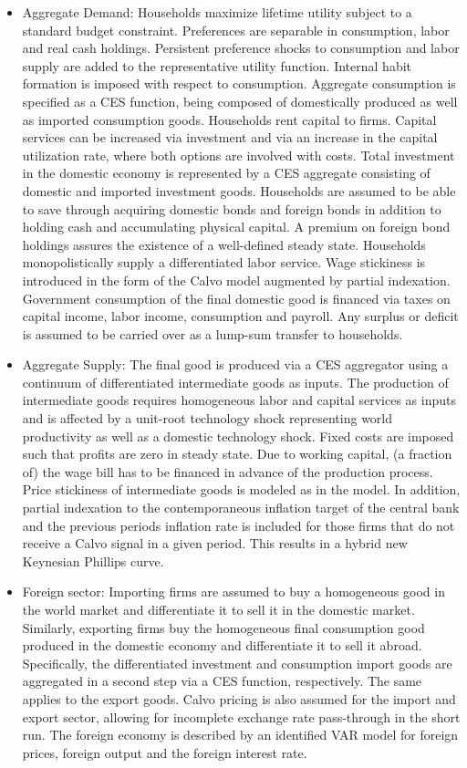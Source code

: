 \documentclass[11pt,a4paper]{article}
\begin{document}
	\begin{itemize}
		\item Aggregate Demand: Households maximize lifetime utility subject to a standard budget constraint. Preferences are separable in consumption, labor and real cash holdings. Persistent preference shocks to consumption and labor supply are added to the representative utility function. Internal habit formation is imposed with respect to consumption. Aggregate consumption is specified as a CES function, being composed of domestically produced as well as imported consumption goods. Households rent capital to firms. Capital services can be increased via investment and via an increase in the capital utilization rate, where both options are involved with costs. Total investment in the domestic economy is represented by a CES aggregate consisting of domestic and imported investment goods. Households are assumed to be able to save through acquiring domestic bonds and foreign bonds in addition to holding cash and accumulating physical capital. A premium on foreign bond holdings assures the existence of a well-defined steady state. Households monopolistically supply a differentiated labor service. Wage stickiness is introduced in the form of the Calvo model augmented by partial indexation. \\ Government consumption of the final domestic good is financed via taxes on capital income, labor income, consumption and payroll. Any surplus or deficit is assumed to be carried over as a lump-sum transfer to households.
		\item Aggregate Supply: The final good is produced via a CES aggregator using a continuum of differentiated intermediate goods as inputs. The production of intermediate goods requires homogeneous labor and capital services as inputs and is affected by a unit-root technology shock representing world productivity as well as a domestic technology shock. Fixed costs are imposed such that profits are zero in steady state. Due to working capital, (a fraction of) the wage bill has to be financed in advance of the production process. Price stickiness of intermediate goods is modeled as in the \cite{Calvo1983} model. In addition, partial indexation to the contemporaneous inflation target of the central bank and the previous periods inflation rate is included for those firms that do not receive a Calvo signal in a given period. This results in a hybrid new Keynesian Phillips curve.
		\item Foreign sector: Importing firms are assumed to buy a homogeneous good in the world market and differentiate it to sell it in the domestic market. Similarly, exporting firms buy the homogeneous final consumption good produced in the domestic economy and differentiate it to sell it abroad. Specifically, the differentiated investment and consumption import goods are aggregated in a second step via a CES function, respectively. The same applies to the export goods. Calvo pricing is also assumed for the import and export sector, allowing for incomplete exchange rate pass-through in the short run. The foreign economy is described by an identified VAR model for foreign prices, foreign output and the foreign interest rate.

\end{itemize}
\end{document}
